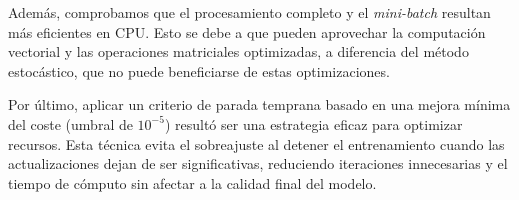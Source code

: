 Además, comprobamos que el procesamiento completo y el \textit{mini-batch} resultan más eficientes en CPU. Esto se debe a que pueden aprovechar la computación vectorial y las operaciones matriciales optimizadas, a diferencia del método estocástico, que no puede beneficiarse de estas optimizaciones.

Por último, aplicar un criterio de parada temprana basado en una mejora mínima del coste (umbral de $10^{-5}$) resultó ser una estrategia eficaz para optimizar recursos. Esta técnica evita el sobreajuste al detener el entrenamiento cuando las actualizaciones dejan de ser significativas, reduciendo iteraciones innecesarias y el tiempo de cómputo sin afectar a la calidad final del modelo.

